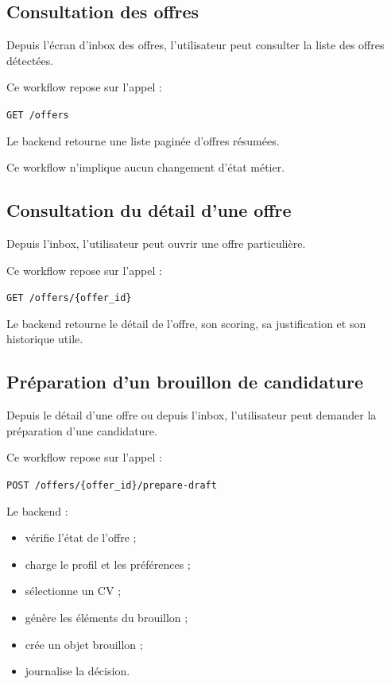 \documentclass[11pt,a4paper]{article}
\begin{document}
\subsection{Consultation des offres}

Depuis l’écran d’inbox des offres, l’utilisateur peut consulter la liste des offres détectées.

Ce workflow repose sur l’appel :

\begin{center}
\texttt{GET /offers}
\end{center}

Le backend retourne une liste paginée d’offres résumées.

Ce workflow n’implique aucun changement d’état métier.

\subsection{Consultation du détail d’une offre}

Depuis l’inbox, l’utilisateur peut ouvrir une offre particulière.

Ce workflow repose sur l’appel :

\begin{center}
\texttt{GET /offers/\{offer\_id\}}
\end{center}

Le backend retourne le détail de l’offre, son scoring, sa justification et son historique utile.

\subsection{Préparation d’un brouillon de candidature}

Depuis le détail d’une offre ou depuis l’inbox, l’utilisateur peut demander la préparation d’une candidature.

Ce workflow repose sur l’appel :

\begin{center}
\texttt{POST /offers/\{offer\_id\}/prepare-draft}
\end{center}

Le backend :

\begin{itemize}
    \item vérifie l’état de l’offre ;
    \item charge le profil et les préférences ;
    \item sélectionne un CV ;
    \item génère les éléments du brouillon ;
    \item crée un objet brouillon ;
    \item journalise la décision.
\end{itemize}
\end{document}
